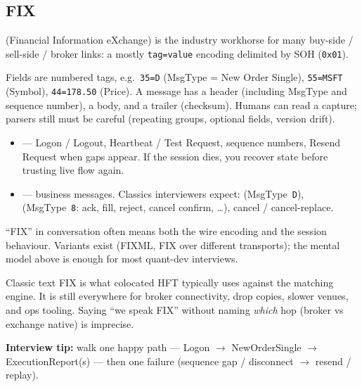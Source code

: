 \subsection{FIX}
\label{subsec:fix-protocol}
 (Financial Information eXchange) is the industry workhorse for 
many buy-side / sell-side / broker links: a mostly  
\texttt{tag=value} encoding delimited by SOH (\texttt{0x01}).

Fields are numbered tags, e.g.\ \texttt{35=D} (MsgType = New Order Single), 
\texttt{55=MSFT} (Symbol), \texttt{44=178.50} (Price). A message has a header 
(including MsgType and sequence number), a body, and a trailer (checksum). 
Humans can read a capture; parsers still must be careful (repeating groups, 
optional fields, version drift).

\begin{itemize}
    \item {} --- Logon / Logout, Heartbeat / Test Request, 
          sequence numbers, Resend Request when gaps appear. If the session dies, 
          you  recover state before trusting live flow again.
    \item {} --- business messages. Classics interviewers 
          expect:  (MsgType~\texttt{D}), 
           (MsgType~\texttt{8}: ack, fill, reject, 
          cancel confirm, \ldots), cancel / cancel-replace.
\end{itemize}
``FIX'' in conversation often means both the wire encoding and the session 
behaviour. Variants exist (FIXML, FIX over different transports); the mental 
model above is enough for most quant-dev interviews.

Classic text FIX is  what colocated HFT typically uses against the 
matching engine. It is still everywhere for broker connectivity, drop copies, 
slower venues, and ops tooling. Saying ``we speak FIX'' without naming 
\emph{which} hop (broker vs exchange native) is imprecise.

\par\noindent\textbf{Interview tip:} walk one happy path --- Logon $\rightarrow$ 
NewOrderSingle $\rightarrow$ ExecutionReport(s) --- then one failure 
(sequence gap / disconnect $\rightarrow$ resend / replay).

